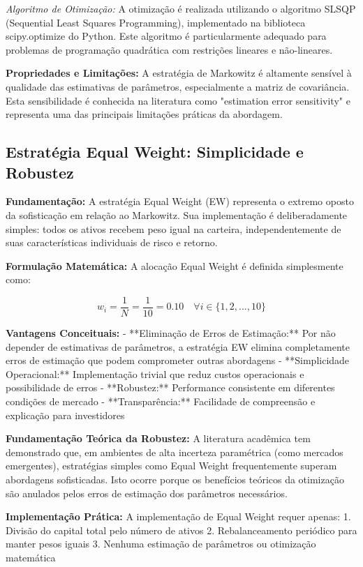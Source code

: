 \textit{Algoritmo de Otimização:} A otimização é realizada utilizando o algoritmo SLSQP (Sequential Least Squares Programming), implementado na biblioteca scipy.optimize do Python. Este algoritmo é particularmente adequado para problemas de programação quadrática com restrições lineares e não-lineares.

\textbf{Propriedades e Limitações:} A estratégia de Markowitz é altamente sensível à qualidade das estimativas de parâmetros, especialmente a matriz de covariância. Esta sensibilidade é conhecida na literatura como "estimation error sensitivity" e representa uma das principais limitações práticas da abordagem.

\subsection{Estratégia Equal Weight: Simplicidade e Robustez}

\textbf{Fundamentação:} A estratégia Equal Weight (EW) representa o extremo oposto da sofisticação em relação ao Markowitz. Sua implementação é deliberadamente simples: todos os ativos recebem peso igual na carteira, independentemente de suas características individuais de risco e retorno.

\textbf{Formulação Matemática:} A alocação Equal Weight é definida simplesmente como:

\begin{equation}
w_i = \frac{1}{N} = \frac{1}{10} = 0.10 \quad \forall i \in \{1, 2, ..., 10\}
\end{equation}

\textbf{Vantagens Conceituais:}
- **Eliminação de Erros de Estimação:** Por não depender de estimativas de parâmetros, a estratégia EW elimina completamente erros de estimação que podem comprometer outras abordagens
- **Simplicidade Operacional:** Implementação trivial que reduz custos operacionais e possibilidade de erros
- **Robustez:** Performance consistente em diferentes condições de mercado
- **Transparência:** Facilidade de compreensão e explicação para investidores

\textbf{Fundamentação Teórica da Robustez:} A literatura acadêmica tem demonstrado que, em ambientes de alta incerteza paramétrica (como mercados emergentes), estratégias simples como Equal Weight frequentemente superam abordagens sofisticadas. Isto ocorre porque os benefícios teóricos da otimização são anulados pelos erros de estimação dos parâmetros necessários.

\textbf{Implementação Prática:} A implementação de Equal Weight requer apenas:
1. Divisão do capital total pelo número de ativos
2. Rebalanceamento periódico para manter pesos iguais
3. Nenhuma estimação de parâmetros ou otimização matemática

